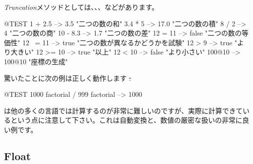 \documentclass[a4paper,10pt,twoside]{book}
\begin{document}
\emph{Truncation}メソッドとしては、、、などがあります。

\begin{code}{@TEST}
1 + 2.5     --> 3.5             "二つの数の和"
3.4 * 5      --> 17.0           "二つの数の積"
8 / 2         --> 4                 "二つの数の商"
10 - 8.3   --> 1.7              "二つの数の差"
12 = 11    --> false           "二つの数の等価性"
12 ~= 11 --> true            "二つの数が異なるかどうかを試験"
12 > 9      --> true            "より大きい"
12 >= 10  --> true            "以上"
12 < 10    --> false           "より小さい"
100@10   --> 100@10    "座標の生成"
\end{code}

驚いたことに次の例は正しく動作します \st:
\begin{code}{@TEST}
1000 factorial / 999 factorial --> 1000
\end{code}
は他の多くの言語では計算するのが非常に難しいのですが、実際に計算できているという点に注意して下さい。これは自動変換と、数値の厳密な扱いの非常に良い例です。


\subsection{Float}
\end{document}
